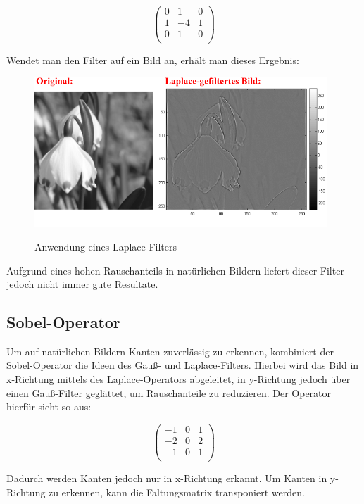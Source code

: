 $$ \left( \begin{array}{rrr}
0 & 1 & 0 \\
1 & -4 & 1 \\
0 & 1 & 0 \\
\end{array}\right) $$

Wendet man den Filter auf ein Bild an, erhält man dieses Ergebnis:

\begin{figure}[ht]
   \centering
     \includegraphics[width=11cm]{Bilder/Laplace} \\
 \caption{Anwendung eines Laplace-Filters}
 \label{fig:Laplace}
\end{figure}

Aufgrund eines hohen Rauschanteils in natürlichen Bildern liefert dieser Filter jedoch nicht immer gute Resultate.

\subsection{Sobel-Operator}
Um auf natürlichen Bildern Kanten zuverlässig zu erkennen, kombiniert der Sobel-Operator die Ideen des Gauß- und Laplace-Filters.
Hierbei wird das Bild in x-Richtung mittels des Laplace-Operators abgeleitet, in y-Richtung jedoch über einen Gauß-Filter geglättet,
um Rauschanteile zu reduzieren.
Der Operator hierfür sieht so aus:

$$ \left( \begin{array}{rrr}
-1 & 0 & 1 \\
-2 & 0 & 2 \\
-1 & 0 & 1 \\
\end{array}\right) $$

Dadurch werden Kanten jedoch nur in x-Richtung erkannt.
Um Kanten in y-Richtung zu erkennen, kann die Faltungsmatrix transponiert werden.

